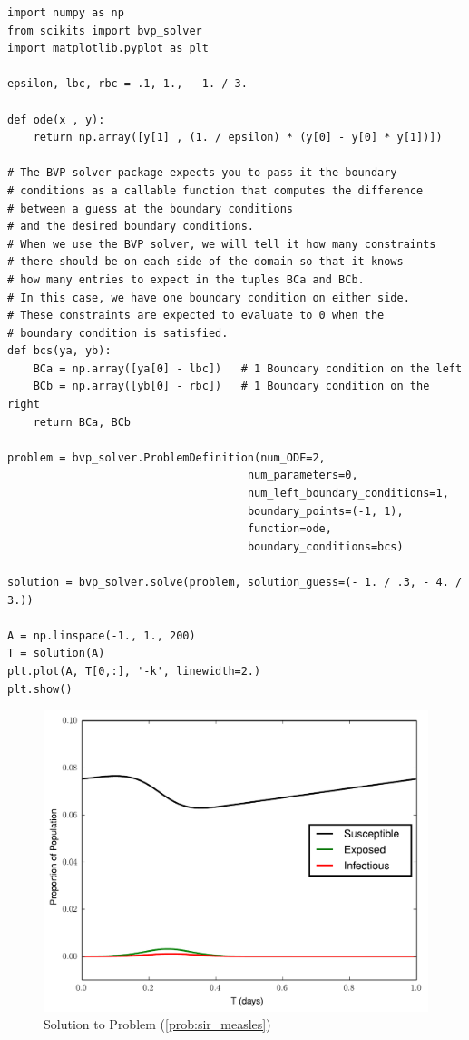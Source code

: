 \begin{lstlisting}
import numpy as np
from scikits import bvp_solver
import matplotlib.pyplot as plt

epsilon, lbc, rbc = .1, 1., - 1. / 3.

def ode(x , y):
    return np.array([y[1] , (1. / epsilon) * (y[0] - y[0] * y[1])])

# The BVP solver package expects you to pass it the boundary
# conditions as a callable function that computes the difference
# between a guess at the boundary conditions
# and the desired boundary conditions.
# When we use the BVP solver, we will tell it how many constraints
# there should be on each side of the domain so that it knows
# how many entries to expect in the tuples BCa and BCb.
# In this case, we have one boundary condition on either side.
# These constraints are expected to evaluate to 0 when the
# boundary condition is satisfied.
def bcs(ya, yb):
    BCa = np.array([ya[0] - lbc])   # 1 Boundary condition on the left
    BCb = np.array([yb[0] - rbc])   # 1 Boundary condition on the right
    return BCa, BCb

problem = bvp_solver.ProblemDefinition(num_ODE=2,
                                     num_parameters=0,
                                     num_left_boundary_conditions=1,
                                     boundary_points=(-1, 1),
                                     function=ode,
                                     boundary_conditions=bcs)

solution = bvp_solver.solve(problem, solution_guess=(- 1. / .3, - 4. / 3.))

A = np.linspace(-1., 1., 200)
T = solution(A)
plt.plot(A, T[0,:], '-k', linewidth=2.)
plt.show()
\end{lstlisting}

\begin{figure}[ht]
\centering
\includegraphics[width=\textwidth]{measles.pdf}
\caption{Solution to Problem (\ref{prob:sir_measles})}
\label{fig:sir4}
\end{figure}

